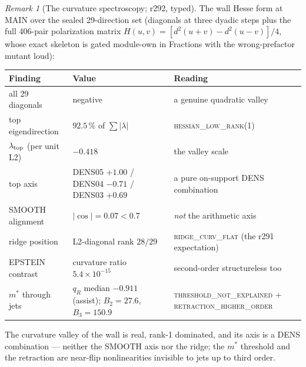 \documentclass[11pt]{article}
\theoremstyle{definition}
\theoremstyle{remark}
\newtheorem{remark}[theorem]{Remark}
\begin{document}
\begin{remark}[The curvature spectroscopy; r292, typed]
\label{rem:spectroscopy}
The wall Hesse form at MAIN over the sealed 29-direction set
(diagonals at three dyadic steps plus the full 406-pair polarization
matrix $H(u,v) = [d^2(u{+}v) - d^2(u{-}v)]/4$, whose exact skeleton
is gated module-own in Fractions with the wrong-prefactor mutant
loud):
\begin{center}\small
\begin{tabular}{@{}lll@{}}
\toprule
\textbf{Finding} & \textbf{Value} & \textbf{Reading}\\
\midrule
all 29 diagonals & negative & a genuine quadratic valley\\
top eigendirection & $92.5\,\%$ of $\sum|\lambda|$ &
\textsc{hessian\_low\_rank}(1)\\
$\lambda_{\rm top}$ (per unit L2) & $-0.418$ & the valley scale\\
top axis & DENS05 $+1.00$ / DENS04 $-0.71$ / DENS03 $+0.69$ &
a pure on-support DENS combination\\
SMOOTH alignment & $|\cos| = 0.07 < 0.7$ & \emph{not} the arithmetic
axis\\
ridge position & L2-diagonal rank $28/29$ &
\textsc{ridge\_curv\_flat} (the r291 expectation)\\
EPSTEIN contrast & curvature ratio $5.4\times10^{-15}$ &
second-order structureless too\\
$m^*$ through jets & $q_R$ median $-0.911$ (assist);
$B_2 = 27.6$, $B_3 = 150.9$ & \textsc{threshold\_not\_explained} +
\textsc{retraction\_higher\_order}\\
\bottomrule
\end{tabular}
\end{center}
The curvature valley of the wall is real, rank-1 dominated, and its
axis is a DENS combination --- neither the SMOOTH axis nor the ridge;
the $m^*$ threshold and the retraction are near-flip nonlinearities
invisible to jets up to third order.
\end{remark}
\end{document}
